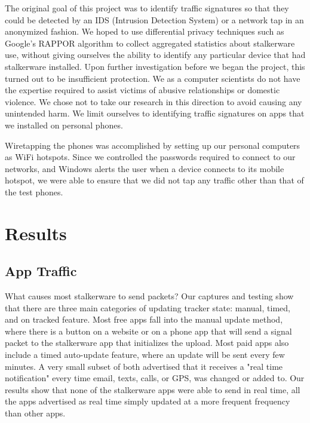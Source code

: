 \documentclass[acmtog]{acmart}
\begin{document}
The original goal of this project was to identify traffic signatures so that 
they could be detected by an IDS (Intrusion Detection System) or a network 
tap in an anonymized fashion. We hoped to use differential privacy techniques 
such as Google's RAPPOR algorithm \cite{erlingsson_rappor:_2014} to collect 
aggregated statistics about stalkerware use, without giving ourselves the 
ability to identify any particular device that had stalkerware installed. Upon 
further investigation before we began the project, this turned out to be 
insufficient protection. We as a computer 
scientists do not have the expertise required to assist victims of abusive 
relationships or domestic violence. We chose not to take our research in this 
direction to avoid causing any unintended harm. We limit ourselves to 
identifying traffic signatures on apps that we installed on personal phones.

Wiretapping the phones was accomplished by setting up our personal computers as 
WiFi hotspots. Since we controlled the passwords required to connect to our 
networks, and Windows alerts the user when a device connects to its mobile 
hotspot, we were able to ensure that we did not tap any traffic other than that 
of the test phones. 
\section{Results}
\subsection{App Traffic}

What causes most stalkerware to send packets? Our captures and testing show 
that there are three main categories of updating tracker state: manual, timed, 
and on tracked feature. Most free apps fall into the manual update method, 
where there is a button on a website or on a phone app that will send a signal 
packet to the stalkerware app that initializes the upload. Most paid apps also 
include a timed auto-update feature, where an update will be sent every few 
minutes. A very small subset of both advertised that it receives a "real time 
notification" every time email, texts, calls, or GPS, was changed or added to. 
Our results show that none of the stalkerware apps were able to send in real 
time, all the apps advertised as real time simply updated at a more frequent 
frequency than other apps.
\end{document}
